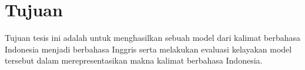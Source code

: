 \section{Tujuan}

Tujuan tesis ini adalah untuk menghasilkan sebuah model  \amrparsing{} dari kalimat berbahasa Indonesia menjadi \AMR{} berbahasa Inggris serta melakukan evaluasi kelayakan model tersebut dalam merepresentasikan makna kalimat berbahasa Indonesia.
